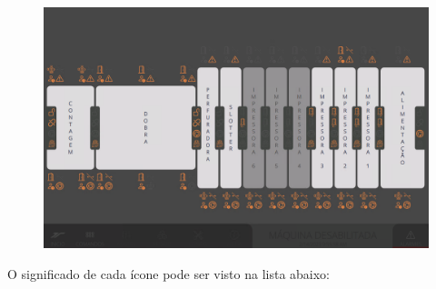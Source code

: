 \begin{figure}[h]
    \centering
    \includegraphics[width=384 px,height=240 px]{src/imagesFlexo/13-alarmsScreen/telaOverview.png}
  \end{figure}

O significado de cada ícone pode ser visto na lista abaixo:


